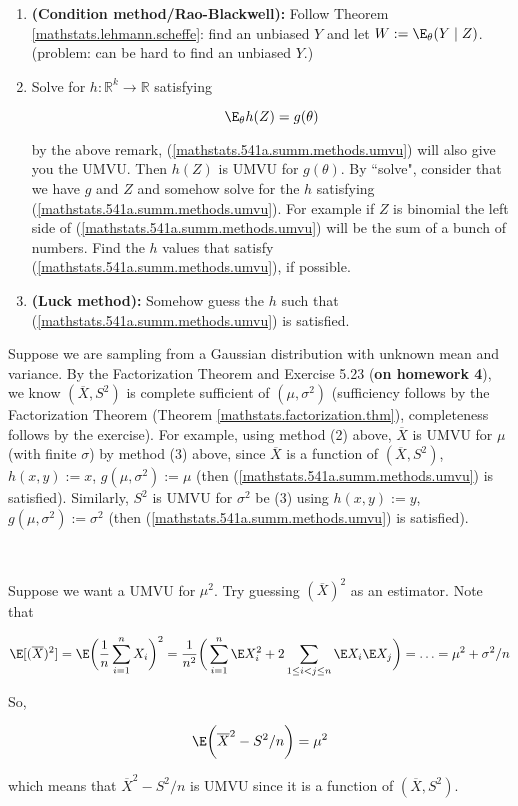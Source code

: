 \begin{enumerate}[(1)]

\item \textbf{(Condition method/Rao-Blackwell):} Follow Theorem \ref{mathstats.lehmann.scheffe}: find an unbiased \(Y\) and let \(W:= \E_\theta(Y \mid Z)\). (problem: can be hard to find an unbiased \(Y\).)

\item Solve for \(h: \mathbb{R}^k \to \mathbb{R}\) satisfying

 \begin{equation}\label{mathstats.541a.summ.methods.umvu}
\E_\theta h(Z) = g(\theta)
\end{equation}

by the above remark, (\ref{mathstats.541a.summ.methods.umvu}) will also give you the UMVU. Then \(h(Z)\) is UMVU for \(g(\theta)\). By ``solve", consider that we have \(g\) and \(Z\) and somehow solve for the \(h\) satisfying (\ref{mathstats.541a.summ.methods.umvu}). For example if \(Z\) is binomial the left side of (\ref{mathstats.541a.summ.methods.umvu}) will be the sum of a bunch of numbers. Find the \(h\) values that satisfy (\ref{mathstats.541a.summ.methods.umvu}), if possible.

\item \textbf{(Luck method):} Somehow guess the \(h\) such that (\ref{mathstats.541a.summ.methods.umvu}) is satisfied.

\end{enumerate}

\begin{example} Suppose we are sampling from a Gaussian distribution with unknown mean and variance. By the Factorization Theorem and Exercise 5.23 (\textbf{on homework 4}), we know \((\overline{X}, S^2)\) is complete sufficient of \((\mu, \sigma^2)\) (sufficiency follows by the Factorization Theorem (Theorem \ref{mathstats.factorization.thm}), completeness follows by the exercise). For example, using method (2) above, \(\overline{X}\) is UMVU for \(\mu\) (with finite \(\sigma\)) by method (3) above, since \(\overline{X}\) is a function of \((\overline{X}, S^2)\), \(h(x,y):= x\), \(g(\mu, \sigma^2) := \mu\) (then (\ref{mathstats.541a.summ.methods.umvu}) is satisfied). Similarly, \(S^2\) is UMVU for \(\sigma^2\) be (3) using \(h(x,y) := y\), \(g(\mu, \sigma^2) := \sigma^2\) (then (\ref{mathstats.541a.summ.methods.umvu}) is satisfied).

\

Suppose we want a UMVU for \(\mu^2\). Try guessing \((\overline{X})^2\) as an estimator. Note that 

\[
\E[(\overline{X})^2] = \E \bigg( \frac{1}{n} \sum_{i=1}^n X_i \bigg)^2 = \frac{1}{n^2} \bigg( \sum_{i=1}^n \E X_i^2 + 2 \sum_{1 \leq i < j \leq n} \E X_i \E X_j \bigg) = \ldots =  \mu^2 + \sigma^2/n
\]

So,

\[
\E \bigg( \overline{X}^2 - S^2/n \bigg) = \mu^2
\]

which means that \( \overline{X}^2 - S^2/n\) is UMVU since it is a function of \((\overline{X}, S^2)\).

\end{example}

